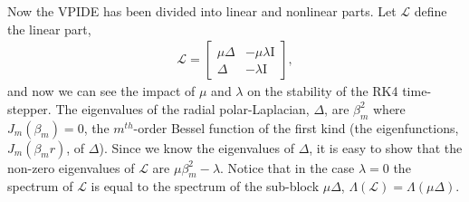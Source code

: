 \documentclass[12pt]{article}
\def\b{\beta}
\begin{document}
Now the VPIDE has been divided into linear and nonlinear parts. Let $\mathcal{L}$ define the linear part,
\begin{align*}
    \mathcal{L}=\begin{bmatrix}\mu\Delta & -\mu\lambda\mbox{I}\\
\Delta & -\lambda\mbox{I}\end{bmatrix},
\end{align*}
and now we can see the impact of $\mu$ and $\lambda$ on the stability of the RK4 time-stepper. The eigenvalues of the radial polar-Laplacian, $\Delta$, are $\b_m^2$ where $J_m(\b_m)=0$, the $m^{th}$-order Bessel function of the first kind (the eigenfunctions, $J_m(\b_m r)$, of $\Delta$). Since we know the eigenvalues of $\Delta$, it is easy to show that the non-zero eigenvalues of $\mathcal{L}$ are $\mu\b_m^2-\lambda$. Notice that in the case $\lambda=0$ the spectrum of $\mathcal{L}$ is equal to the spectrum of the sub-block $\mu\Delta$, $\Lambda(\mathcal{L})=\Lambda(\mu\Delta)$.



\end{document}
